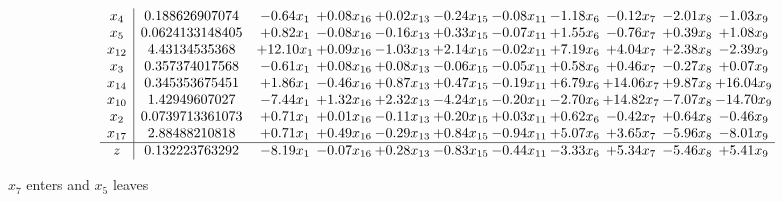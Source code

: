 \documentclass[9pt]{article}
\begin{document}
 \[\begin{array}{c| c c@{\hskip 2pt} c@{\hskip 2pt} c@{\hskip 2pt} c@{\hskip 2pt} c@{\hskip 2pt} c@{\hskip 2pt} c@{\hskip 2pt} c@{\hskip 2pt} c@{\hskip 2pt} }
 x_{4}   &  0.188626907074 & -0.64 x_{1} & +  0.08 x_{16} & +  0.02 x_{13} & -0.24 x_{15} & -0.08 x_{11} & -1.18 x_{6} & -0.12 x_{7} & -2.01 x_{8} & -1.03 x_{9}\\
 x_{5}   &  0.0624133148405 & +  0.82 x_{1} & -0.08 x_{16} & -0.16 x_{13} & +  0.33 x_{15} & -0.07 x_{11} & +  1.55 x_{6} & -0.76 x_{7} & +  0.39 x_{8} & +  1.08 x_{9}\\
 x_{12}   &  4.43134535368 & + 12.10 x_{1} & +  0.09 x_{16} & -1.03 x_{13} & +  2.14 x_{15} & -0.02 x_{11} & +  7.19 x_{6} & +  4.04 x_{7} & +  2.38 x_{8} & -2.39 x_{9}\\
 x_{3}   &  0.357374017568 & -0.61 x_{1} & +  0.08 x_{16} & +  0.08 x_{13} & -0.06 x_{15} & -0.05 x_{11} & +  0.58 x_{6} & +  0.46 x_{7} & -0.27 x_{8} & +  0.07 x_{9}\\
 x_{14}   &  0.345353675451 & +  1.86 x_{1} & -0.46 x_{16} & +  0.87 x_{13} & +  0.47 x_{15} & -0.19 x_{11} & +  6.79 x_{6} & + 14.06 x_{7} & +  9.87 x_{8} & + 16.04 x_{9}\\
 x_{10}   &  1.42949607027 & -7.44 x_{1} & +  1.32 x_{16} & +  2.32 x_{13} & -4.24 x_{15} & -0.20 x_{11} & -2.70 x_{6} & + 14.82 x_{7} & -7.07 x_{8} & -14.70 x_{9}\\
 x_{2}   &  0.0739713361073 & +  0.71 x_{1} & +  0.01 x_{16} & -0.11 x_{13} & +  0.20 x_{15} & +  0.03 x_{11} & +  0.62 x_{6} & -0.42 x_{7} & +  0.64 x_{8} & -0.46 x_{9}\\
 x_{17}   &  2.88488210818 & +  0.71 x_{1} & +  0.49 x_{16} & -0.29 x_{13} & +  0.84 x_{15} & -0.94 x_{11} & +  5.07 x_{6} & +  3.65 x_{7} & -5.96 x_{8} & -8.01 x_{9}\\
\hline
z    &  0.132223763292 & -8.19 x_{1} & -0.07 x_{16} & +  0.28 x_{13} & -0.83 x_{15} & -0.44 x_{11} & -3.33 x_{6} & +  5.34 x_{7} & -5.46 x_{8} & +  5.41 x_{9}\\
\end{array}\]


 $ x_{7} $ enters and $ x_{5} $ leaves 
\end{document}
